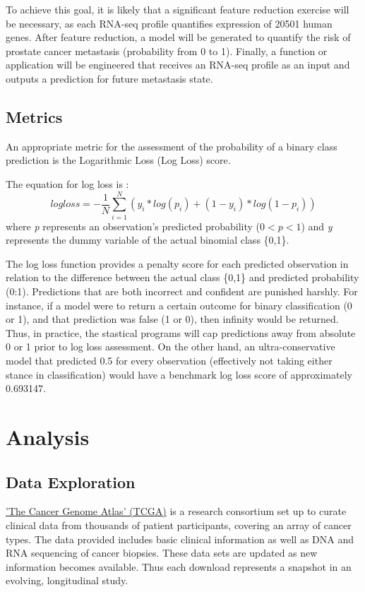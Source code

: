 \documentclass[final]{article}
\begin{document}
To achieve this goal, it is likely that a  significant feature reduction
exercise will be necessary, as each  RNA-seq profile quantifies expression of
20501 human genes.  After feature reduction, a model will be generated to
quantify the risk of prostate cancer metastasis (probability from 0 to 1).
Finally, a function or application will be engineered that receives an RNA-seq
profile as an input and outputs a prediction for future metastasis state.

\subsection{Metrics}

An appropriate metric for the assessment of the probability of a binary class prediction is the
Logarithmic Loss (Log Loss) score.

The equation for log loss is : $$ logloss = -\frac{1}{N} \sum_{i=1}^{N} (y_i
*log(p_i) + (1- y_i) * log(1-p_i)) $$ where \textit{p} represents an observation's
predicted probability ($0 < \textit{p} < 1$) and \textit{y} represents the dummy variable of the actual binomial class
\{0,1\}.

The log loss function provides a penalty score for each predicted observation in
relation to the difference between the actual class \{0,1\} and predicted
probability (0:1).  Predictions that are both incorrect and confident are
punished harshly.  For instance, if a model were to return a certain outcome for
binary classification (0 or 1), and that prediction was false (1 or 0), then
infinity would be returned. Thus, in practice, the stastical programs will cap
predictions away from  absolute 0 or 1 prior to log loss assessment.  On the
other hand, an ultra-conservative model that predicted 0.5 for every observation
(effectively not taking either stance in classification) would have a benchmark
log loss score of approximately 0.693147.


\section{Analysis}

\subsection{Data Exploration}

\href{www.http://cancergenome.nih.gov/}{'The Cancer Genome Atlas' (TCGA)} is a
research consortium set up to curate clinical data from thousands of patient
participants, covering an array of cancer types.   The data provided includes basic
clinical information as well as DNA and RNA sequencing of cancer biopsies. These
data sets are updated as new information becomes available.  Thus
each download represents a snapshot in an evolving, longitudinal study.
\end{document}
